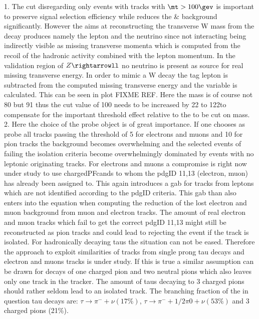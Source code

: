  1. The \mt cut disregarding only events with tracks with $\mt>100\gev$ is important to preserve signal selection efficiency while reduces the \ttbar \& \wpj background significantly. However the \mt aims at reconstructing the transverse W mass from the decay produces namely the lepton and the neutrino since not interacting being indirectly visible as missing transverse momenta which is computed from the recoil of the hadronic activity combined with the lepton momentum. In the validation region of $Z\rightarrowll$ no neutrino is present as source for real missing transverse energy. In order to mimic a W decay the tag lepton is subtracted from the computed missing transverse energy and the \mt variable is calculated. This can be seen in plot FIXME REF. Here the mass is of course not 80 but 91 \gev thus the cut value of 100 \gev needs to be increased by 22 \gev to 122\gev to compensate for the important threshold effect relative to the to be cut on mass.\\
 2. Here the choice of the probe object is of great importance. If one chooses as probe all tracks passing the \pt threshold of 5 \gev for electrons and muons and 10 \gev for pion tracks the background becomes overwhelming and the selected events of failing the isolation criteria become overwhelmingly dominated by events with no leptonic originating tracks. For electrons and muons a compromise is right now under study to use chargedPFcands to whom the pdgID 11,13 (electron, muon) has already been assigned to. This again introduces a gab for tracks from leptons which are not identified according to the pdgID criteria. This gab than also enters into the equation when computing the reduction of the lost electron and muon background from muon and electron tracks. The amount of real electron and muon tracks which fail to get the correct pdgID 11,13 might still be reconstructed as pion tracks and could lead to rejecting the event if the track is isolated.
 For hadronically decaying taus the situation can not be eased. Therefore the approach to exploit similarities of tracks from single prong tau decays and electron and muons tracks is under study. If this is true a similar assumption can be drawn for decays of one charged pion and two neutral pions which also leaves only one track in the tracker. The amount of taus decaying to 3 charged pions should rather seldom lead to an isolated track. The branching fraction of the in question tau decays are: $\tau\rightarrow\pi^{-} + \nu (17\%)$, $\tau\rightarrow\pi^{-} + 1/2\pi0 + \nu (53\%)$ and 3 charged pions (21\%).\\

